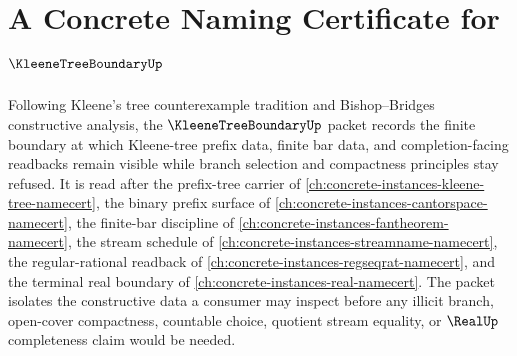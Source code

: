 \chapter{A Concrete Naming Certificate for $\KleeneTreeBoundaryUp$}
\label{ch:concrete-instances-kleene-tree-boundary-namecert}

Following Kleene's tree counterexample tradition and Bishop--Bridges constructive analysis, the $\KleeneTreeBoundaryUp$ packet records the finite boundary at which Kleene-tree prefix data, finite bar data, and completion-facing readbacks remain visible while branch selection and compactness principles stay refused. It is read after the prefix-tree carrier of \autoref{ch:concrete-instances-kleene-tree-namecert}, the binary prefix surface of \autoref{ch:concrete-instances-cantorspace-namecert}, the finite-bar discipline of \autoref{ch:concrete-instances-fantheorem-namecert}, the stream schedule of \autoref{ch:concrete-instances-streamname-namecert}, the regular-rational readback of \autoref{ch:concrete-instances-regseqrat-namecert}, and the terminal real boundary of \autoref{ch:concrete-instances-real-namecert}. The packet isolates the constructive data a consumer may inspect before any illicit branch, open-cover compactness, countable choice, quotient stream equality, or $\RealUp$ completeness claim would be needed.

